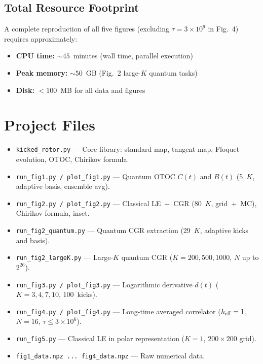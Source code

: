 \documentclass[11pt,a4paper]{article}
\newcommand{\hb}{\hbar_{\rm eff}}
\begin{document}
\subsection{Total Resource Footprint}

A complete reproduction of all five figures (excluding $\tau=3\times10^{9}$ in Fig.~4) requires approximately:
\begin{itemize}[leftmargin=*]
\item \textbf{CPU time:} $\sim45$~minutes (wall time, parallel execution)
\item \textbf{Peak memory:} $\sim50$~GB (Fig.~2 large-$K$ quantum tasks)
\item \textbf{Disk:} $<100$~MB for all data and figures
\end{itemize}

\section{Project Files}

\begin{itemize}[leftmargin=*]
\item \texttt{kicked\_rotor.py} --- Core library: standard map, tangent map, Floquet evolution, OTOC, Chirikov formula.
\item \texttt{run\_fig1.py / plot\_fig1.py} --- Quantum OTOC $C(t)$ and $B(t)$ (5~$K$, adaptive basis, ensemble avg).
\item \texttt{run\_fig2.py / plot\_fig2.py} --- Classical LE~+~CGR (80~$K$, grid~+~MC), Chirikov formula, inset.
\item \texttt{run\_fig2\_quantum.py} --- Quantum CGR extraction (29~$K$, adaptive kicks and basis).
\item \texttt{run\_fig2\_largeK.py} --- Large-$K$ quantum CGR ($K=200,500,1000$, $N$ up to $2^{26}$).
\item \texttt{run\_fig3.py / plot\_fig3.py} --- Logarithmic derivative $d(t)$ ($K=3,4,7,10$, 100~kicks).
\item \texttt{run\_fig4.py / plot\_fig4.py} --- Long-time averaged correlator ($\hb=1$, $N=16$, $\tau\leq3\times10^{6}$).
\item \texttt{run\_fig5.py} --- Classical LE in polar representation ($K=1$, $200\times200$ grid).
\item \texttt{fig1\_data.npz ... fig4\_data.npz} --- Raw numerical data.
\end{itemize}
\end{document}
